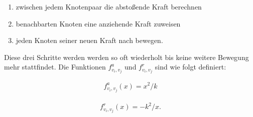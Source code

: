 \begin{enumerate}
	\item zwischen jedem Knotenpaar die abstoßende Kraft berechnen
	\item benachbarten Knoten eine anziehende Kraft zuweisen
	\item jeden Knoten seiner neuen Kraft nach bewegen.
\end{enumerate} 
Diese drei Schritte werden werden so oft wiederholt bis keine weitere Bewegung mehr stattfindet.
Die Funktionen \begin{math} f^{a}_{v_{i},v_{j}} \end{math} und \begin{math} f^{r}_{v_{i},v_{j}} \end{math} sind wie folgt definiert:

   
	\begin{align}
		f^{a}_{v_{i},v_{j}} (x) =
			x^{2}/k
	\end{align}
    
    \begin{align}
		f^{r}_{v_{i},v_{j}} (x) =
		-k^{2}/x.
    \end{align}
    

